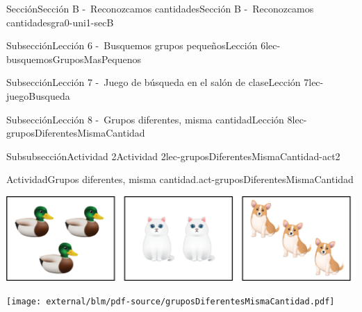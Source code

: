 \begin{sectionptx}{Sección}{Sección B -~Reconozcamos cantidades}{}{Sección B -~Reconozcamos cantidades}{}{}{gra0-uni1-secB}
%
%
\typeout{************************************************}
\typeout{************************************************}
%
\begin{subsectionptx}{Subsección}{Lección 6 -~Busquemos grupos pequeños}{}{Lección 6}{}{}{lec-busquemosGruposMasPequenos}
\end{subsectionptx}
%
%
\typeout{************************************************}
\typeout{************************************************}
%
\begin{subsectionptx}{Subsección}{Lección 7 -~Juego de búsqueda en el salón de clase}{}{Lección 7}{}{}{lec-juegoBusqueda}
\end{subsectionptx}
%
%
\typeout{************************************************}
\typeout{************************************************}
%
\begin{subsectionptx}{Subsección}{Lección 8 -~Grupos diferentes, misma cantidad}{}{Lección 8}{}{}{lec-gruposDiferentesMismaCantidad}
%
%
\typeout{************************************************}
\typeout{************************************************}
%
\begin{subsubsectionptx}{Subsubsección}{Actividad 2}{}{Actividad 2}{}{}{lec-gruposDiferentesMismaCantidad-act2}
\begin{activity}{Actividad}{Grupos diferentes, misma cantidad.}{act-gruposDiferentesMismaCantidad}%
\begin{image}{0}{1}{0}{}%
\includegraphics[max width=\linewidth, center]{external/png-source/K.1.C Beta Student Workbook.AnimalGroups.png}
\end{image}%
\begin{cutoutpage}
\texttt{[image: external/blm/pdf-source/gruposDiferentesMismaCantidad.pdf]}
\cleardoublepage

\end{cutoutpage}
\end{activity}
\end{subsubsectionptx}
\end{subsectionptx}
\end{sectionptx}
